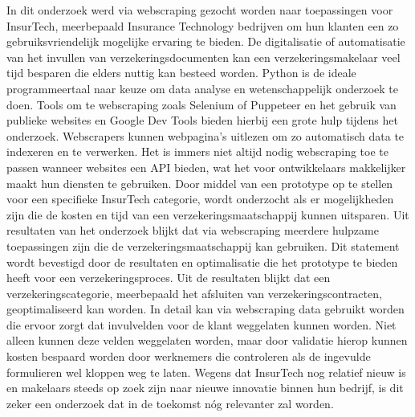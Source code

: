In dit onderzoek werd via webscraping gezocht worden naar toepassingen voor InsurTech, meerbepaald Insurance Technology bedrijven om hun klanten een zo gebruiksvriendelijk mogelijke ervaring te bieden. De digitalisatie of automatisatie van het invullen van verzekeringsdocumenten kan een verzekeringsmakelaar veel tijd besparen die elders nuttig kan besteed worden. Python is de ideale programmeertaal naar keuze om data analyse en wetenschappelijk onderzoek te doen. Tools om te webscraping zoals Selenium of Puppeteer en het gebruik van publieke websites en Google Dev Tools bieden hierbij een grote hulp tijdens het onderzoek. Webscrapers kunnen webpagina’s uitlezen om zo automatisch data te indexeren en te verwerken. Het is immers niet altijd nodig webscraping toe te passen wanneer websites een API bieden, wat het voor ontwikkelaars makkelijker maakt hun diensten te gebruiken. Door middel van een prototype op te stellen voor een specifieke InsurTech categorie, wordt onderzocht als er mogelijkheden zijn die de kosten en tijd van een verzekeringsmaatschappij kunnen uitsparen. Uit resultaten van het onderzoek blijkt dat via webscraping meerdere hulpzame toepassingen zijn die de verzekeringsmaatschappij kan gebruiken. Dit statement wordt bevestigd door de resultaten en optimalisatie die het prototype te bieden heeft voor een verzekeringsproces. Uit de resultaten blijkt dat een verzekeringscategorie, meerbepaald het afsluiten van verzekeringscontracten, geoptimaliseerd kan worden. In detail kan via webscraping data gebruikt worden die ervoor zorgt dat invulvelden voor de klant weggelaten kunnen worden. Niet alleen kunnen deze velden weggelaten worden, maar door validatie hierop kunnen kosten bespaard worden door werknemers die controleren als de ingevulde formulieren wel kloppen weg te laten. Wegens dat InsurTech nog relatief nieuw is en makelaars steeds op zoek zijn naar nieuwe innovatie binnen hun bedrijf, is dit zeker een onderzoek dat in de toekomst nóg relevanter zal worden.
